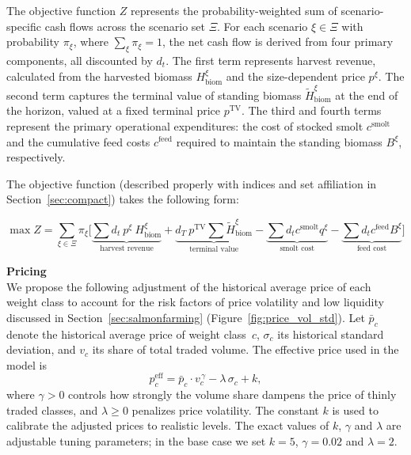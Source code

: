 \documentclass[12pt,a4paper]{article}
\begin{document}
The objective function $Z$ represents the probability-weighted sum of scenario-specific cash flows across the scenario set $\Xi$. For each scenario $\xi \in \Xi$ with probability $\pi_\xi$, where $\sum_\xi \pi_\xi = 1$, the net cash flow is derived from four primary components, all discounted by $d_t$. The first term represents harvest revenue, calculated from the harvested biomass $H^{\xi}_{\mathrm{biom}}$ and the size-dependent price $p^\xi$. The second term captures the terminal value of standing biomass $\tilde{H}^{\xi}_{\mathrm{biom}}$ at the end of the horizon, valued at a fixed terminal price $p^{\mathrm{TV}}$. The third and fourth terms represent the primary operational expenditures: the cost of stocked smolt $c^{\mathrm{smolt}}$ and the cumulative feed costs $c^{\mathrm{feed}}$ required to maintain the standing biomass $B^{\xi}$, respectively.
 
The objective function (described properly with indices and set affiliation in Section~\ref{sec:compact}) takes the following form:
 
\begin{equation}
  \max Z = \sum_{\xi \in \Xi} \pi_\xi \Big[ 
    \underbrace{\textstyle\sum d_t \  p^\xi\ H^{\xi}_{\mathrm{biom}}}_{\text{harvest revenue}}
    + \underbrace{d_T\ p^{\mathrm{TV}} \textstyle\sum \tilde{H}^{\xi}_{\mathrm{biom}}}_{\text{terminal value}}
    - \underbrace{\textstyle\sum d_t c^{\mathrm{smolt}} q^{\xi}}_{\text{smolt cost}}
    - \underbrace{\textstyle\sum d_t c^{\mathrm{feed}} B^{\xi}}_{\text{feed cost}} \Big]
  \label{eq:obj_sketch}
\end{equation}
 
 
\noindent \textbf{Pricing} 
\\
We propose the following adjustment of the historical average price of each weight class to account for the risk factors of price volatility and low liquidity discussed in Section~\ref{sec:salmonfarming} (Figure~\ref{fig:price_vol_std}). Let $\bar{p}_c$ denote the historical average price of weight class~$c$, $\sigma_c$ its historical standard deviation, and $v_c$ its share of total traded volume. The effective price used in the model is
\begin{equation}
\label{eq:adjusted_price}
  p_c^{\mathrm{eff}} = \bar{p}_c \cdot v_c^{\,\gamma} - \lambda\,\sigma_c + k,
\end{equation}
where $\gamma > 0$ controls how strongly the volume share dampens the price of thinly traded classes, and $\lambda \geq 0$ penalizes price volatility. The constant $k$ is used to calibrate the adjusted prices to realistic levels. The exact values of $k$, $\gamma$ and $\lambda$ are adjustable tuning parameters; in the base case we set $k = 5$, $\gamma = 0.02$ and $\lambda = 2$.
 
\end{document}
